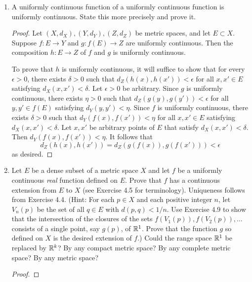 \documentclass[../psets.tex]{subfiles}
\begin{document}
\begin{enumerate}[label={\textbf{\arabic*.}}]
\begin{proof}
    \end{proof}
    \item A uniformly continuous function of a uniformly continuous function is uniformly continuous. State this more precisely and prove it.
    \begin{proof}
        Let $(X,d_X),(Y,d_Y),(Z,d_Z)$ be metric spaces, and let $E\subset X$. Suppose $f:E\to Y$ and $g:f(E)\to Z$ are uniformly continuous. Then the composition $h:E\to Z$ of $f$ and $g$ is uniformly continuous.\par
        To prove that $h$ is uniformly continuous, it will suffice to show that for every $\epsilon>0$, there exists $\delta>0$ such that $d_Z(h(x),h(x'))<\epsilon$ for all $x,x'\in E$ satisfying $d_X(x,x')<\delta$. Let $\epsilon>0$ be arbitrary. Since $g$ is uniformly continuous, there exists $\eta>0$ such that $d_Z(g(y),g(y'))<\epsilon$ for all $y,y'\in f(E)$ satisfying $d_Y(y,y')<\eta$. Since $f$ is uniformly continuous, there exists $\delta>0$ such that $d_Y(f(x),f(x'))<\eta$ for all $x,x'\in E$ satisfying $d_X(x,x')<\delta$. Let $x,x'$ be arbitrary points of $E$ that satisfy $d_X(x,x')<\delta$. Then $d_Y(f(x),f(x'))<\eta$. It follows that
        \begin{equation*}
            d_Z(h(x),h(x')) = d_Z(g(f(x)),g(f(x'))) < \epsilon
        \end{equation*}
        as desired.
    \end{proof}
    \item Let $E$ be a dense subset of a metric space $X$ and let $f$ be a uniformly continuous \emph{real} function defined on $E$. Prove that $f$ has a continuous extension from $E$ to $X$ (see Exercise 4.5 for terminology). Uniqueness follows from Exercise 4.4. (Hint: For each $p\in X$ and each positive integer $n$, let $V_n(p)$ be the set of all $q\in E$ with $d(p,q)<1/n$. Use Exercise 4.9 to show that the intersection of the closures of the sets $f(V_1(p)),f(V_2(p)),\dots$ consists of a single point, say $g(p)$, of $\mathbb{R}^1$. Prove that the function $g$ so defined on $X$ is the desired extension of $f$.) Could the range space $\mathbb{R}^1$ be replaced by $\mathbb{R}^k$? By any compact metric space? By any complete metric space? By any metric space?
    \begin{proof}

\end{proof}
\end{enumerate}
\end{document}
